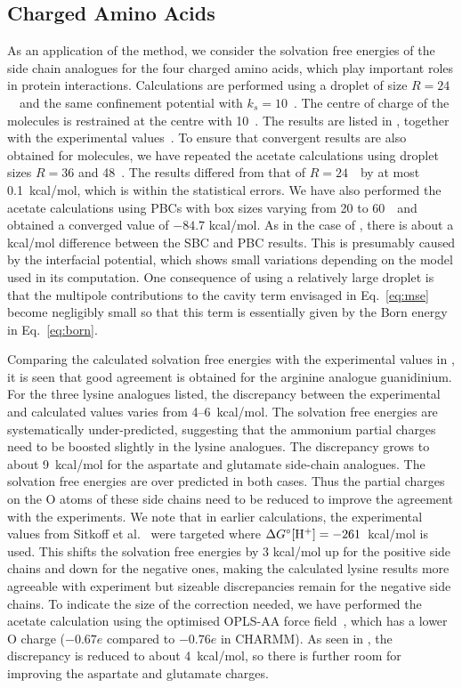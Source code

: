 \subsection{Charged Amino Acids}
\label{sec:chargedamino}
As an application of the method, we consider the solvation free energies of the side chain analogues 
for the four charged amino acids, which play important roles in protein interactions. Calculations 
are performed using a droplet of size $R=24$~\angs\ and the same confinement potential with 
$k_{s}=10$~\spring. The centre of charge of the molecules is restrained at the centre 
with 10~\spring. The results are listed in , together with the experimental 
values~\cite{Reif2012,Kelly2006}. To ensure that convergent results are also obtained for molecules, 
we have repeated the acetate calculations using droplet sizes $R=36$ and 48~\angs. The results differed 
from that of $R=24$~\angs\ by at most 0.1~kcal/mol, which is within the statistical errors. We have also 
performed the acetate calculations using PBCs with box sizes varying from 20 to 60~\angs\ and obtained 
a converged value of $−84.7$ kcal/mol. As in the case of \Cl, there is about a kcal/mol difference 
between the SBC and PBC results. This is presumably caused by the interfacial potential, which shows 
small variations depending on the model used in its computation. One consequence of using a relatively 
large droplet is that the multipole contributions to the cavity term envisaged in Eq.~\eqref{eq:mse} 
become negligibly small so that this term is essentially given by the Born energy in Eq.~\eqref{eq:born}.

Comparing the calculated solvation free energies with the experimental values in , 
it is seen that good agreement is obtained for the arginine analogue guanidinium. For the three lysine 
analogues listed, the discrepancy between the experimental and calculated values varies from 
4--6~kcal/mol. The solvation free energies are systematically under-predicted, suggesting that the 
ammonium partial charges need to be boosted slightly in the lysine analogues. The discrepancy grows 
to about 9~kcal/mol for the aspartate and glutamate side-chain analogues. The solvation free energies 
are over predicted in both cases. Thus the partial charges on the O atoms of these side chains need 
to be reduced to improve the agreement with the experiments. We note that in earlier calculations, 
the experimental values from Sitkoff et al.~\cite{Sitkoff1994} were targeted where 
$\Delta G^{\circ} [{\rm H}^+] =-261$~kcal/mol is used. This shifts the solvation free energies by 
3 kcal/mol up for the positive side chains and down for the negative ones, making the calculated 
lysine results more agreeable with experiment but sizeable discrepancies remain for the negative 
side chains. To indicate the size of the correction needed, we have performed the acetate calculation 
using the optimised OPLS-AA force field~\cite{Jensen2008}, which has a lower O charge ($-0.67e$ 
compared to $-0.76e$ in CHARMM). As seen in , the discrepancy is reduced to about 
4~kcal/mol, so there is further room for improving the aspartate and glutamate charges.

